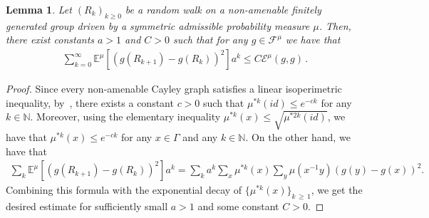 \documentclass[10pt]{amsart}
\newtheorem{lemm}[theo]{Lemma}\newtheorem{prop}[theo]{Proposition}\newtheorem{coro}[theo]{Corollary}\newtheorem{conj}[theo]{Conjecture}
\theoremstyle{definition}\newtheorem{defi}[theo]{Definition}\newtheorem{rema}[theo]{Remark}\newtheorem{exam}[theo]{Example}\newtheorem{exem}[theo]{Example}\newtheorem{nota}[theo]{Notation}
\newcommand{\ce}{\mathcal{E}}
\newcommand{\cf}{\mathcal{F}}
\newcommand{\bn}{\mathbb{N}}
\newcommand{\be}{\mathbb{E}}
\begin{document}
\begin{lemm}\label{ac}
Let $(R_k)_{k\geq0}$ be a random walk on a non-amenable finitely generated group driven by a symmetric admissible probability measure $\mu$. Then, there exist constants $a>1$ and $C>0$ such that for any $g\in\cf^{\mu}$ we have that
\begin{align}\label{pi; mu}
\sum_{k=0}^{\infty}\be^{\mu}\left[\left(g(R_{k+1})-g(R_k)\right)^2\right]a^k\leq C\ce^\mu(g,g)\,.
\end{align}
\end{lemm}

\begin{proof}
Since every non-amenable Cayley graph satisfies a linear isoperimetric inequality, by~\cite[Theorem~10.3]{Woe}, there exists a constant $c>0$ such that $\mu^{*k}(id)\leq e^{-ck}$ for any $k\in\bn$. Moreover, using the elementary inequality $\mu^{*k}(x)\leq\sqrt{\mu^{*2k}(id)}$, we have that $\mu^{*k}(x)\leq e^{-ck}$ for any $x\in\Gamma$ and any $k\in\bn$. On the other hand, we have that
\begin{align*}
\sum_{k}\be^{\mu}\left[\left(g(R_{k+1})-g(R_k)\right)^2\right]a^k=\sum_ka^k\sum_x\mu^{*k}(x)\sum_{y}\mu\left(x^{-1}y\right)(g(y)-g(x))^2.
\end{align*}
Combining this formula with the exponential decay of $\{\mu^{*k}(x)\}_{k\,\geq\,1}$, we get the desired estimate for sufficiently small $a>1$ and some constant $C>0$.
\end{proof}
\end{document}
